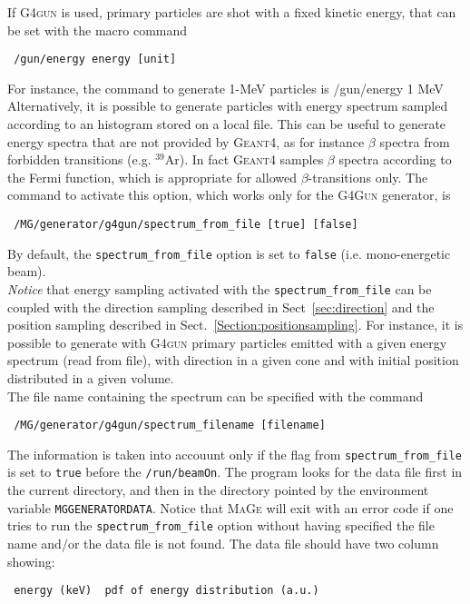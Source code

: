 If \textsc{G4gun} is used, primary particles are shot with a fixed kinetic energy, 
that can be set with the macro command 
\begin{lstlisting}
 /gun/energy energy [unit]
\end{lstlisting}
For instance, the command to generate 1-MeV particles is 
/gun/energy 1 MeV \\

Alternatively, it is possible to generate particles with energy spectrum sampled according 
to an histogram stored on a local file. This can be useful to generate energy spectra that 
are not provided by \textsc{Geant4}, as for instance $\beta$ spectra from forbidden transitions 
(e.g. $^{39}$Ar). In fact \textsc{Geant4} samples $\beta$ spectra according to the Fermi function, 
which is appropriate for allowed $\beta$-transitions only.
The command to activate this 
option, which works only for the \textsc{G4Gun} generator, is
\begin{lstlisting}
 /MG/generator/g4gun/spectrum_from_file [true] [false]
\end{lstlisting}
By default, the \texttt{spectrum\_from\_file} option is set to \texttt{false} (i.e. mono-energetic 
beam). \\
\emph{Notice} that energy sampling activated with the \texttt{spectrum\_from\_file} can be coupled with 
the direction sampling described in Sect~\ref{sec:direction} and the position sampling described in 
Sect.~\ref{Section:positionsampling}. For instance, it is possible to generate with \textsc{G4gun} 
primary particles emitted with a given energy spectrum (read from file), with direction in a given cone 
and with initial position distributed in a given volume. \\
% 
The file name containing the spectrum can be specified with the command
\begin{lstlisting}
 /MG/generator/g4gun/spectrum_filename [filename]
\end{lstlisting}
The information is taken into accouunt only if the flag from \texttt{spectrum\_from\_file} is set to 
\texttt{true} before the \texttt{/run/beamOn}. The program looks for the data file first in the current 
directory, and then in the directory pointed by the environment variable \texttt{MGGENERATORDATA}. Notice 
that \textsc{MaGe} will exit with an error code if one tries to run the \texttt{spectrum\_from\_file} 
option without having specified the file name and/or the data file is not found. 
The data file should have two column showing: 
\begin{lstlisting}
 energy (keV)  pdf of energy distribution (a.u.)
\end{lstlisting}

